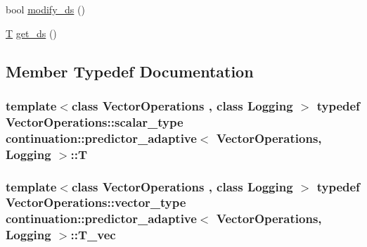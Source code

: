 \begin{DoxyCompactItemize}
\item 
bool \hyperlink{classcontinuation_1_1predictor__adaptive_aafc990e5ecaf56de9769e12dd0b23a0a}{modify\-\_\-ds} ()
\item 
\hyperlink{classcontinuation_1_1predictor__adaptive_add46ad992055f6fad831be827ae49ddb}{T} \hyperlink{classcontinuation_1_1predictor__adaptive_a228c5f1d3043154a10acc4bf697bbddf}{get\-\_\-ds} ()
\end{DoxyCompactItemize}


\subsection{Member Typedef Documentation}
\hypertarget{classcontinuation_1_1predictor__adaptive_add46ad992055f6fad831be827ae49ddb}{
\subsubsection[{T}]{\setlength{\rightskip}{0pt plus 5cm}template$<$class Vector\-Operations , class Logging $>$ typedef Vector\-Operations\-::scalar\-\_\-type {\bf continuation\-::predictor\-\_\-adaptive}$<$ Vector\-Operations, Logging $>$\-::{\bf T}}}\label{classcontinuation_1_1predictor__adaptive_add46ad992055f6fad831be827ae49ddb}
\hypertarget{classcontinuation_1_1predictor__adaptive_ae84bcc7dd9cf2c85cd18bbb0de1c42b2}{
\subsubsection[{T\-\_\-vec}]{\setlength{\rightskip}{0pt plus 5cm}template$<$class Vector\-Operations , class Logging $>$ typedef Vector\-Operations\-::vector\-\_\-type {\bf continuation\-::predictor\-\_\-adaptive}$<$ Vector\-Operations, Logging $>$\-::{\bf T\-\_\-vec}}}\label{classcontinuation_1_1predictor__adaptive_ae84bcc7dd9cf2c85cd18bbb0de1c42b2}


